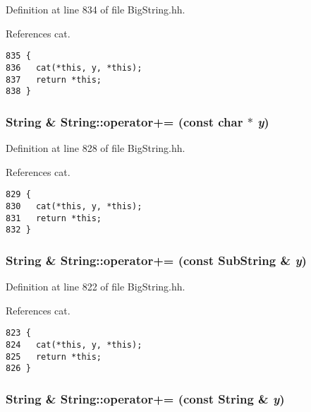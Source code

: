 Definition at line 834 of file Big\-String.hh.

References cat.



\footnotesize\begin{verbatim}835 {
836   cat(*this, y, *this);
837   return *this;
838 }
\end{verbatim}\normalsize 
{}
\subsubsection{\setlength{\rightskip}{0pt plus 5cm}String \& String::operator+= (const char $\ast$ {\em y})\hspace{0.3cm}{\tt  [inline]}}\label{classString_a19}




Definition at line 828 of file Big\-String.hh.

References cat.



\footnotesize\begin{verbatim}829 {
830   cat(*this, y, *this);
831   return *this;
832 }
\end{verbatim}\normalsize 
{}
\subsubsection{\setlength{\rightskip}{0pt plus 5cm}String \& String::operator+= (const {\bf Sub\-String} \& {\em y})\hspace{0.3cm}{\tt  [inline]}}\label{classString_a18}




Definition at line 822 of file Big\-String.hh.

References cat.



\footnotesize\begin{verbatim}823 {
824   cat(*this, y, *this);
825   return *this;
826 }
\end{verbatim}\normalsize 
{}
\subsubsection{\setlength{\rightskip}{0pt plus 5cm}String \& String::operator+= (const String \& {\em y})\hspace{0.3cm}{\tt  [inline]}}\label{classString_a17}





